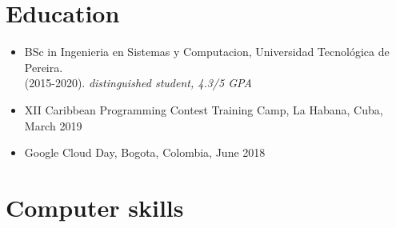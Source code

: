 \documentclass[11pt,a4paper,sans]{moderncv}        %
\begin{document}
\section{Education}
\begin{itemize}
  \item{BSc in Ingenieria en Sistemas y Computacion, Universidad Tecnológica de Pereira. \\ (2015-2020). \textit{distinguished student, 4.3/5 GPA}}
  \item{XII Caribbean Programming Contest Training Camp, La Habana, Cuba, March 2019}
  \item{ Google Cloud Day, Bogota, Colombia, June 2018}
\end{itemize}



\section{Computer skills}

\nocite{*}

\end{document}
